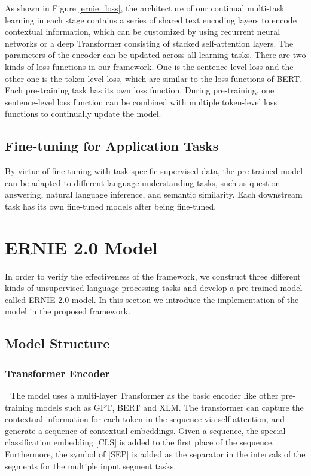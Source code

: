 \documentclass[letterpaper]{article} \usepackage{aaai20}  \usepackage{times}  \usepackage{helvet} \usepackage{courier}  \usepackage[hyphens]{url}  \usepackage{graphicx} \usepackage{makecell}
\begin{document}
As shown in Figure \ref{ernie_loss}, the architecture of our continual multi-task learning in each stage contains a series of shared text encoding layers to encode contextual information, which can be customized by using recurrent neural networks or a deep Transformer consisting of stacked self-attention layers\cite{vaswani2017attention}.
The parameters of the encoder can be updated across all learning tasks. 
There are two kinds of loss functions in our framework. 
One is the sentence-level loss and the other one is the token-level loss, which are similar to the loss functions of BERT.
Each pre-training task has its own loss function. 
During pre-training, one sentence-level loss function can be combined with multiple token-level loss functions to continually update the model.



\subsection{Fine-tuning for Application Tasks}
By virtue of fine-tuning with task-specific supervised data, the pre-trained model can be adapted to different language understanding tasks, such as question answering, natural language inference, and semantic similarity. Each downstream task has its own fine-tuned models after being fine-tuned.

\section{ERNIE 2.0 Model}
In order to verify the effectiveness of the framework, we construct three different kinds of unsupervised language processing tasks and develop a pre-trained model called ERNIE 2.0 model. In this section we introduce the implementation of the model in the proposed framework.


\subsection{Model Structure}
\subsubsection{Transformer Encoder} \,\,
The model uses a multi-layer Transformer\cite{vaswani2017attention} as the basic encoder like other pre-training models such as GPT\cite{radford2018improving}, BERT\cite{devlin2018bert} and XLM\cite{lample2019cross}. The transformer can capture the contextual information for each token in the sequence via self-attention, and generate a sequence of contextual embeddings. Given a sequence, the special classification embedding [CLS] is added to the first place of the sequence. Furthermore, the symbol of [SEP] is added as the separator in the intervals of the segments for the multiple input segment tasks.
\end{document}
